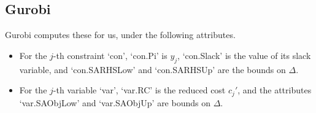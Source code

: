 \documentclass[12pt,a4paper]{article} %
\begin{document}
\subsection{Gurobi}
Gurobi computes these for us, under the following attributes.
\begin{itemize}
    \item For the $j$-th constraint `con', `con.Pi' 
    is $y_j$, `con.Slack' is the value of its slack variable, and
    `con.SARHSLow' and `con.SARHSUp' are the bounds on $\Delta$.
    \item For the $j$-th variable `var', `var.RC' is the reduced cost $c_j'$,
    and the attributes `var.SAObjLow' and `var.SAObjUp' are bounds on $\Delta$.
\end{itemize}
\end{document}
